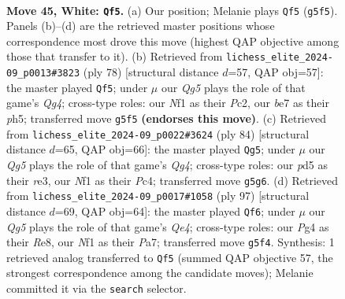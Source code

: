 \documentclass[11pt]{article}
\begin{document}
\clearpage

\begin{figure}[p]\centering
\begin{subfigure}{0.46\textwidth}\centering
\resizebox{\linewidth}{!}{%
\newchessgame
\chessboard[
  setfen={r5r1/p3b1pp/2k5/3p2QP/pq1P2P1/4P2K/8/5N2 w - - 4 45},
  showmover=false,
  pgfstyle=straightmove, color=movearrow, markmove={g5-f5}
]}
\caption{}
\end{subfigure}\hfill
\begin{subfigure}{0.46\textwidth}\centering
\resizebox{\linewidth}{!}{%
\newchessgame
\chessboard[
  setfen={4q1rk/2R3p1/2p5/p2p3p/P5Q1/1P4P1/2P3KP/8 w - - 0 40},
  showmover=false,
  pgfstyle=straightmove, color=movearrow, markmove={g4-f5}
]}
\caption{}
\end{subfigure}
\\[4pt]
\begin{subfigure}{0.46\textwidth}\centering
\resizebox{\linewidth}{!}{%
\newchessgame
\chessboard[
  setfen={3R4/5pk1/3b2p1/p1pP3p/2P2PQ1/4r2P/6PK/4q3 w - - 0 43},
  showmover=false,
  pgfstyle=straightmove, color=movearrow, markmove={g4-g5}
]}
\caption{}
\end{subfigure}\hfill
\begin{subfigure}{0.46\textwidth}\centering
\resizebox{\linewidth}{!}{%
\newchessgame
\chessboard[
  setfen={4r3/p5pk/7p/3Rqp2/1PP1p2P/6P1/3Q1P1K/8 b - - 6 49},
  showmover=false,
  pgfstyle=straightmove, color=movearrow, markmove={e5-f6}
]}
\caption{}
\end{subfigure}
\caption{\textbf{Move 45, White: \texttt{Qf5}.} (a) Our position; Melanie plays \texttt{Qf5} (\texttt{g5f5}). Panels (b)--(d) are the retrieved master positions whose correspondence most drove this move (highest QAP objective among those that transfer to it). (b) Retrieved from \texttt{lichess\_elite\_2024-09\_p0013\#3823} (ply 78) [structural distance $d$=57, QAP obj=57]: the master played \texttt{Qf5}; under $\mu$ our \emph{Qg5} plays the role of that game's \emph{Qg4}; cross-type roles: our \emph{N}f1 as their \emph{P}c2, our \emph{b}e7 as their \emph{p}h5; transferred move \texttt{g5f5} \textbf{(endorses this move)}. (c) Retrieved from \texttt{lichess\_elite\_2024-09\_p0022\#3624} (ply 84) [structural distance $d$=65, QAP obj=66]: the master played \texttt{Qg5}; under $\mu$ our \emph{Qg5} plays the role of that game's \emph{Qg4}; cross-type roles: our \emph{p}d5 as their \emph{r}e3, our \emph{N}f1 as their \emph{P}c4; transferred move \texttt{g5g6}. (d) Retrieved from \texttt{lichess\_elite\_2024-09\_p0017\#1058} (ply 97) [structural distance $d$=69, QAP obj=64]: the master played \texttt{Qf6}; under $\mu$ our \emph{Qg5} plays the role of that game's \emph{Qe4}; cross-type roles: our \emph{P}g4 as their \emph{R}e8, our \emph{N}f1 as their \emph{P}a7; transferred move \texttt{g5f4}. Synthesis: 1 retrieved analog transferred to \texttt{Qf5} (summed QAP objective 57, the strongest correspondence among the candidate moves); Melanie committed it via the \texttt{search} selector.}
\label{fig:thought-m88}
\end{figure}
\end{document}
